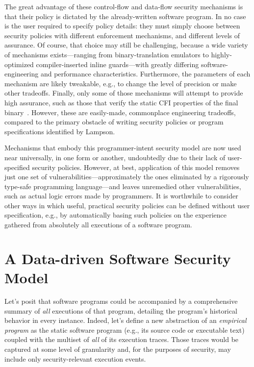 \documentclass{IEEEtran}
\begin{document}
The great advantage of these control-flow and data-flow security mechanisms
is that their policy is dictated by the already-written software program.
In no case
is the user required to specify policy details: they must simply choose between security policies with different enforcement mechanisms, and different levels of assurance.
Of course, that choice may still be challenging, because a wide variety of mechanisms exists---ranging from binary-translation emulators to highly-optimized compiler-inserted inline guards---with greatly differing software-engineering and performance characteristics.
Furthermore, the parameters of each mechanism are likely tweakable, e.g., to change the level of precision or make other tradeoffs.
Finally, only some of those mechanisms will attempt to provide high assurance, such as those that verify the static CFI properties of the final binary~\cite{Strato}.
However, these are easily-made, commonplace engineering tradeoffs, compared to the primary obstacle of writing security policies or program specifications identified by Lampson.



Mechanisms that embody this programmer-intent security model are now used near universally, in one form or another, undoubtedly due to their lack of user-specified security policies.
However, at best, application of this model removes just one set of vulnerabilities---approximately the ones eliminated by a rigorously type-safe programming language---and leaves unremedied other vulnerabilities, such as actual logic errors made by programmers.
It is worthwhile to consider other ways in which useful, practical security policies can be defined without user specification, e.g., by automatically basing such policies on the experience gathered from absolutely all executions of a software program.



\section{A Data-driven Software Security Model}
Let's posit that software programs could be accompanied by a comprehensive summary of \emph{all} executions of that program, detailing the program's historical behavior in every instance.
Indeed, let's define a new abstraction of an \emph{empirical program} as the static software program (e.g., its source code or executable text) coupled with the multiset of \emph{all} of its execution traces.
Those traces would be captured at some level of granularity
and,
for the purposes of security,
may include only security-relevant execution events.
\end{document}
